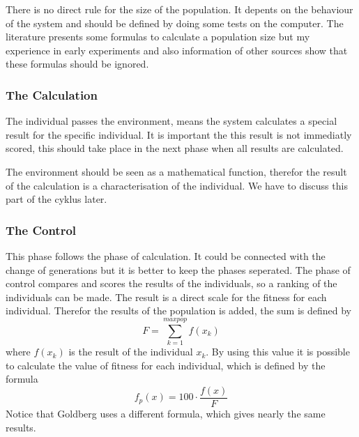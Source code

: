 There is no direct rule for the size of the population. It depents on the behaviour
of the system and should be defined by doing some tests on the computer. The
literature presents some formulas to calculate a population size but my experience
in early experiments\cite{Gri91a,Gri91b} and also information of other sources
\cite{Joc91} show that these formulas should be ignored.
\subsubsection{The Calculation}
The individual passes the environment, means the system calculates a special result
for the specific individual. It is important the this result is not immediatly
scored, this should take place in the next phase when all results are calculated.

The environment should be seen as a mathematical function, therefor the result
of the calculation is a characterisation of the individual. We have to discuss
this part of the cyklus later.
\subsubsection{The Control}
This phase follows the phase of calculation. It could be connected with the
change of generations but it is better to keep the phases seperated. The phase
of control compares and scores the results of the individuals, so a ranking of
the individuals can be made. The result is a direct scale for the fitness for
each individual. Therefor the results of the population is added, the sum is 
defined by
$$F = \sum^{maxpop}_{k=1} f(x_k)$$
where $f(x_k)$ is the result of the individual $x_k$. By using this value it is
possible to calculate the value of fitness for each individual, which is
defined by the formula
$$f_p(x) = 100 \cdot \frac{f(x)}{F}$$
Notice that Goldberg\cite{Gol89} uses a different formula, which gives nearly
the same results.


